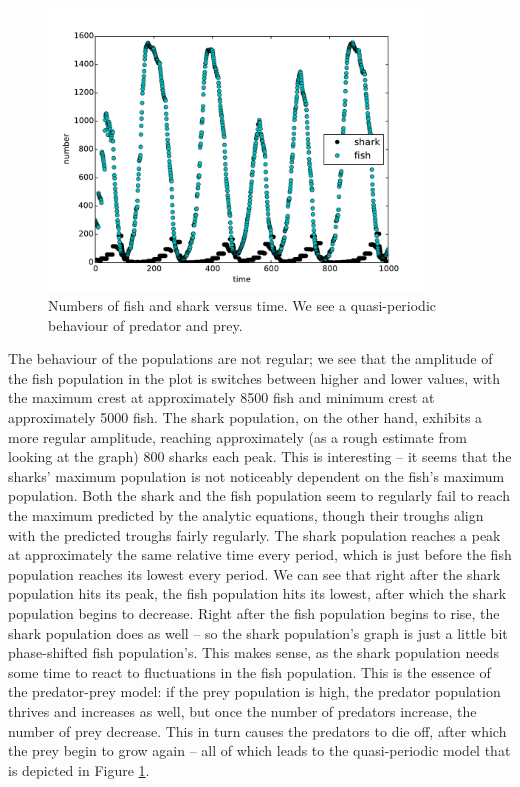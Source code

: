 \documentclass{article}
\begin{document}
\begin{figure}[H]
\centering
\captionsetup{justification=centering, margin=3 cm}
\includegraphics[width=10cm]{population.pdf}
\caption{Numbers of fish and shark versus time. We see a quasi-periodic behaviour of predator and prey.}
\label{fig:graph}
\end{figure}
The behaviour of the populations are not regular; we see that the amplitude of the fish population in the plot is switches between higher and lower values, with the maximum crest at approximately 8500 fish and minimum crest at approximately 5000 fish. The shark population, on the other hand, exhibits a more regular amplitude, reaching approximately (as a rough estimate from looking at the graph) 800 sharks each peak. This is interesting -- it seems that the sharks' maximum population is not noticeably dependent on the fish's maximum population. Both the shark and the fish population seem to regularly fail to reach the maximum predicted by the analytic equations, though their troughs align with the predicted troughs fairly regularly. The shark population reaches a peak at approximately the same relative time every period, which is just before the fish population reaches its lowest every period. We can see that right after the shark population hits its peak, the fish population hits its lowest, after which the shark population begins to decrease. Right after the fish population begins to rise, the shark population does as well -- so the shark population's graph is just a little bit phase-shifted fish population's. This makes sense, as the shark population needs some time to react to fluctuations in the fish population. This is the essence of the predator-prey model: if the prey population is high, the predator population thrives and increases as well, but once the number of predators increase, the number of prey decrease. This in turn causes the predators to die off, after which the prey begin to grow again -- all of which leads to the quasi-periodic model that is depicted in Figure \ref{fig:graph}.\par 
\end{document}
